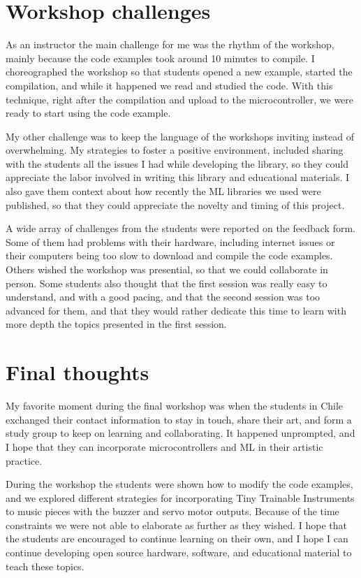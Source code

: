 \section{Workshop challenges}

As an instructor the main challenge for me was the rhythm of the workshop, mainly because the code examples took around 10 minutes to compile. I choreographed the workshop so that students opened a new example, started the compilation, and while it happened we read and studied the code. With this technique, right after the compilation and upload to the microcontroller, we were ready to start using the code example.

My other challenge was to keep the language of the workshops inviting instead of overwhelming. My strategies to foster a positive environment, included sharing  with the students all the issues I had while developing the library, so they could appreciate the labor involved in writing this library and educational materials. I also gave them context about how recently the \acrshort{ML} libraries we used were published, so that they could appreciate the novelty and timing of this project.

A wide array of challenges from the students were reported on the feedback form. Some of them had problems with their hardware, including internet issues or their computers being too slow to download and compile the code examples. Others wished the workshop was presential, so that we could collaborate in person. Some students also thought that the first session was really easy to understand, and with a good pacing, and that the second session was too advanced for them, and that they would rather dedicate this time to learn with more depth the topics presented in the first session.

\section{Final thoughts}

My favorite moment during the final workshop was when the students in Chile exchanged their contact information to stay in touch, share their art, and form a study group to keep on learning and collaborating. It happened unprompted, and I hope that they can incorporate microcontrollers and \acrshort{ML} in their artistic practice.

During the workshop the students were shown how to modify the code examples, and we explored different strategies for incorporating Tiny Trainable Instruments to music pieces with the buzzer and servo motor outputs. Because of the time constraints we were not able to elaborate as further as they wished. I hope that the students are encouraged to continue learning on their own, and I hope I can continue developing open source hardware, software, and educational material to teach these topics.
